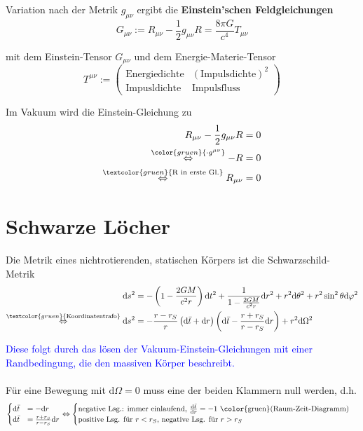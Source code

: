 \documentclass{article}
\newcommand{\diff}{\mathrm{d}}
\newcommand{\lr}[1]{\left(#1\right)}
\newcommand{\commenttext}[1]{\textcolor{gruen}{\text{#1}}}
\newcommand{\comment}[1]{{\color{gruen} {#1}}}
\begin{document}
Variation nach der Metrik $g_{\mu\nu}$ ergibt die \textbf{Einstein'schen Feldgleichungen}
	\begin{equation}
		G_{\mu\nu} := R_{\mu\nu} - \frac{1}{2} g_{\mu\nu} R = \frac{8\pi G}{c^4} T_{\mu\nu}
	\end{equation}

mit dem Einstein-Tensor $G_{\mu\nu}$ und dem Energie-Materie-Tensor
	\begin{equation}
		T^{\mu\nu} :=
		\begin{pmatrix}
			\text{Energiedichte} & (\text{Impulsdichte})^2 \\
			\text{Impusldichte} & \text{Impulsfluss}
		\end{pmatrix}
	\end{equation}


Im Vakuum wird die Einstein-Gleichung zu
	\begin{align*}
		R_{\mu\nu} - \frac{1}{2}g_{\mu\nu} R &= 0 \\
		\stackrel{\comment{\cdot g^{\mu\nu}}}{\Leftrightarrow} -R &= 0 \\
		\stackrel{\commenttext{R in erste Gl.}}{\Leftrightarrow} R_{\mu\nu} &= 0
	\end{align*}


\newpage


\section{Schwarze Löcher}
Die Metrik eines nichtrotierenden, statischen Körpers ist die Schwarzschild-Metrik
	\begin{align}
		\diff s^2 &= -\lr{ 1 - \frac{2GM}{c^2r} } \diff t^2 + \frac{1}{1 - \frac{2GM}{c^2r}} \diff r^2 + r^2 \diff\theta^2 + r^2\sin^2\theta \diff\varphi^2 \\
		\stackrel{\commenttext{Koordinatentrafo}}{\Leftrightarrow} \diff s^2 &= -\frac{r - r_S}{r} \lr{ \diff\bar{t} + \diff r } \lr{ \diff\bar{t} - \frac{r+r_S}{r-r_S}\diff r } + r^2\diff\Omega^2
	\end{align}

\textcolor{blue}{Diese folgt durch das lösen der Vakuum-Einstein-Gleichungen mit einer Randbedingung, die den massiven Körper beschreibt.}\\
\\
Für eine Bewegung mit $\diff\Omega = 0$ muss eine der beiden Klammern null werden, d.h.
	\begin{equation}
		\begin{cases}
			\diff \bar{t} &= -\diff r \\
			\diff \bar{t} &= \frac{r+r_S}{r-r_S}\diff r
		\end{cases}
		\Leftrightarrow
		\begin{cases}
			\text{negative Lsg.: immer einlaufend, $\frac{\diff\bar{t}}{\diff r} = -1$ {\color{gruen}(Raum-Zeit-Diagramm)}} \\
			\text{positive Lsg. für $r<r_S$, negative Lsg. für $r>r_S$}
		\end{cases}		
	\end{equation}
\end{document}
